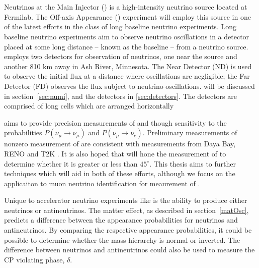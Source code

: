 \chapter{\nova}
\label{nova_chapter}
Neutrinos at the Main Injector (\numi) is a high-intensity neutrino source located at Fermilab.  The \numi Off-axis \nue Appearance (\nova) experiment will employ this source in one of the latest efforts in the class of long baseline neutrino experiments.  Long baseline neutrino experiments aim to observe neutrino oscillations in a detector placed at some long distance -- known as the baseline -- from a neutrino source.  \nova employs two detectors for observation of neutrinos, one near the source and another 810 km away in Ash River, Minnesota.  The Near Detector (ND) is used to observe the initial  \numi flux at a distance where oscillations are negligible; the Far Detector (FD) observes the \numi flux subject to neutrino oscillations.  \numi will be discussed in section~\ref{sec:numi}, and the \nova detectors in \ref{sec:detectors}.  The detectors are comprised of long cells which are arranged horizontally

\nova aims to provide precision measurements of \thetaoth and \thetatth though sensitivity to the probabilities $P(\nu_\mu \rightarrow \nu_\mu)$ and $P(\nu_\mu \rightarrow \nu_e)$.  Preliminary measurements of nonzero measurement of \thetaoth are consistent with measurements from Daya Bay, RENO and T2K \cite{nova2015nue}.  It is also hoped that \nova will  hone the measurement of \thetatth to determine whether it is greater or less than $45^\circ$.  This thesis aims to further techniques which will aid in both of these efforts, although we focus on the applicaiton to muon neutrino identification for meaurement of \thetatth.

Unique to accelerator neutrino experiments like \nova is the ability to produce either neutrinos or antineutrinos.  The matter effect, as described in section~\ref{matOsc}, predicts a difference between the appearance probabilities for neutrinos and antineutrinos.   By comparing the respective appearance probabilities, it could be possible to determine whether the mass hierarchy is normal or inverted.  The difference between neutrinos and antineutrinos could also be used to measure the CP violating phase, $\delta$.


